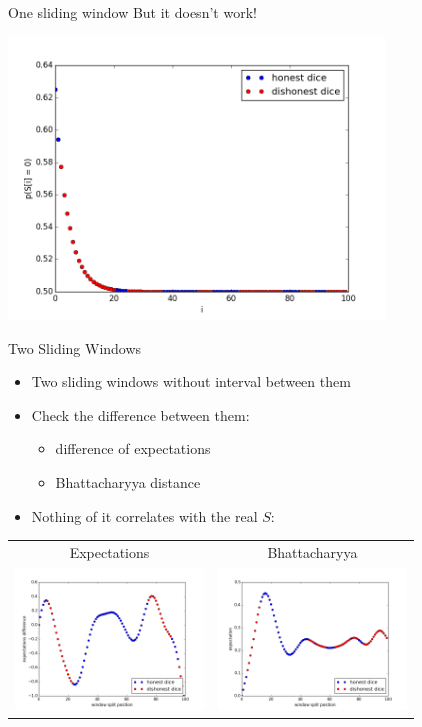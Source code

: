 \documentclass[hyperref=unicode,graphics=pdflatex,13pt]{beamer}
\begin{document}
\begin{frame}{One sliding window}
 But it doesn't work!
 
 \includegraphics[width = 10cm]{one_window_probabilities.png}
\end{frame}


\begin{frame}{Two Sliding Windows}
\begin{itemize}
   \item Two sliding windows without interval between them
   \item Check the difference between them:
   \begin{itemize}
      \item difference of expectations
      \item Bhattacharyya distance
   \end{itemize}
   \item Nothing of it correlates with the real $S$:
\end{itemize}
\begin{tabular}{cc}
 Expectations & Bhattacharyya \\
 \includegraphics[width = 5cm]{two_windows_expectation.png} &
 \includegraphics[width = 5cm]{two_windows_bhattacharyya.png}
\end{tabular}
\end{frame}
\end{document}
